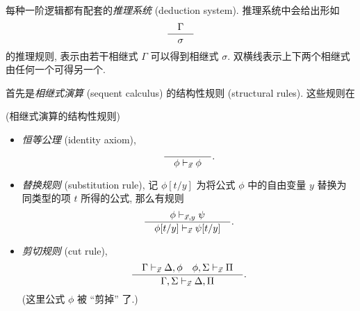 


每种一阶逻辑都有配套的\emph{推理系统} (deduction system). 推理系统中会给出形如
$$
\dfrac{\quad \Gamma \quad}{\quad \sigma \quad}
$$
的推理规则, 表示由若干相继式 $\Gamma$ 可以得到相继式 $\sigma$.
双横线表示上下两个相继式由任何一个可得另一个.

首先是\emph{相继式演算} (sequent calculus) 的结构性规则 (structural rules). 这些规则在

\begin{definition}
	[label={first-order-structural-rules}]
	{(相继式演算的结构性规则)}
	\begin{itemize}
		\item \emph{恒等公理} (identity axiom),
		$$
		\dfrac{\quad  \quad}{\quad \phi\vdash_{\vec x} \phi \quad}.
		$$
		\item \emph{替换规则} (substitution rule),
		记 $\phi[t/y]$ 为将公式 $\phi$ 中的自由变量 $y$ 替换为同类型的项 $t$ 所得的公式, 那么有规则
		$$
		\dfrac{\quad \phi \vdash_{\vec x,y} \psi \quad}{\quad \phi[t/y]\vdash_{\vec x}\psi[t/y] \quad}.
		$$
		\item \emph{剪切规则} (cut rule),
		$$
		\dfrac{\quad 
			\Gamma \vdash_{\vec x} \Delta , \phi
			\quad
			\phi, \Sigma \vdash_{\vec x} \Pi 
		 \quad}{\quad 
			\Gamma,\Sigma \vdash_{\vec x} \Delta,\Pi
		 \quad}.
		$$
		(这里公式 $\phi$ 被 ``剪掉'' 了.)
	\end{itemize}
\end{definition}

